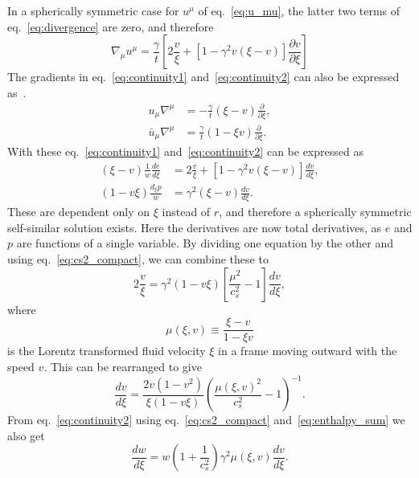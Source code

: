 In a spherically symmetric case for $u^\mu$ of eq.~\eqref{eq:u_mu},
the latter two terms of eq.~\eqref{eq:divergence} are zero, and therefore
\begin{equation}
\nabla_\mu u^\mu = \frac{\gamma}{t} \left[ 2\frac{v}{\xi} + \left[1 - \gamma^2 v (\xi - v) \right] \frac{\partial v}{\partial \xi} \right]
\end{equation}
The gradients in eq.~\eqref{eq:continuity1} and~\eqref{eq:continuity2} can also be expressed as~\cite[eq. 25]{espinosa_energy_2010}.
\begin{align}
u_\mu \nabla^\mu &= - \frac{\gamma}{t} (\xi - v) \frac{\partial}{\partial \xi}, \\
\bar{u}_\mu \nabla^\mu &= \frac{\gamma}{t} (1 - \xi v) \frac{\partial}{\partial \xi}.
\end{align}
With these eq.~\eqref{eq:continuity1} and~\eqref{eq:continuity2} can be expressed as
\begin{align}
(\xi - v) \frac{1}{w} \frac{de}{d\xi} &= 2 \frac{v}{\xi} + \left[ 1 - \gamma^2 v (\xi - v) \right] \frac{dv}{d\xi}, \\
(1 - v\xi) \frac{d_\xi p}{w} &= \gamma^2 (\xi - v) \frac{dv}{d\xi}.
\end{align}
These are dependent only on $\xi$ instead of $r$,
and therefore a spherically symmetric self-similar solution exists.
Here the derivatives are now total derivatives, as $e$ and $p$ are functions of a single variable.
By dividing one equation by the other and using eq.~\eqref{eq:cs2_compact}, we can combine these to
\begin{equation}
2 \frac{v}{\xi} = \gamma^2 (1 - v\xi) \left[ \frac{\mu^2}{c_s^2} - 1 \right] \frac{dv}{d\xi},
\label{eq:continuity_combined}
\end{equation}
where
\begin{equation}
\mu(\xi,v) \equiv \frac{\xi - v}{1 - \xi v}
\label{eq:mu}
\end{equation}
is the
Lorentz transformed fluid velocity
$\xi$ in a frame moving outward with the speed $v$.
This can be rearranged to give
\cites[eq. 7.30-7.31]{lecture_notes}[eq. 5]{giese_2021}
\begin{equation}
\frac{dv}{d\xi} = \frac{2v(1-v^2)}{\xi(1-v\xi)} \left( \frac{\mu(\xi,v)^2}{c_s^2} - 1 \right)^{-1}.
\label{eq:hydro_diff1}
\end{equation}
From eq.~\eqref{eq:continuity2} using eq.~\eqref{eq:cs2_compact} and~\eqref{eq:enthalpy_sum} we also get
\begin{equation}
\frac{dw}{d\xi} = w \left( 1 + \frac{1}{c_s^2} \right) \gamma^2 \mu(\xi,v) \frac{dv}{d\xi}.
\label{eq:hydro_diff2}
\end{equation}


